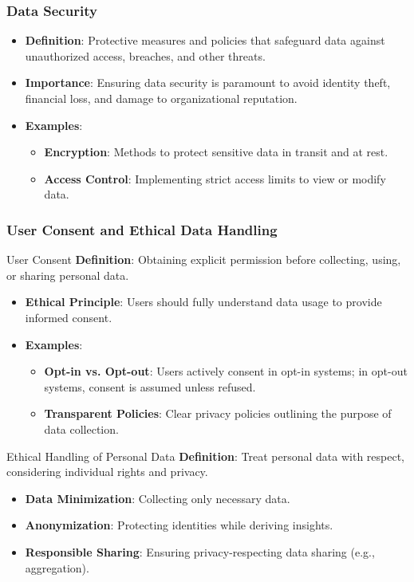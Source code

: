 \documentclass[aspectratio=169]{beamer}
\begin{document}
\begin{frame}[fragile]
    \frametitle{Data Security}
    \begin{itemize}
        \item \textbf{Definition}: Protective measures and policies that safeguard data against unauthorized access, breaches, and other threats.
        \item \textbf{Importance}: Ensuring data security is paramount to avoid identity theft, financial loss, and damage to organizational reputation.
        \item \textbf{Examples}:
        \begin{itemize}
            \item \textbf{Encryption}: Methods to protect sensitive data in transit and at rest.
            \item \textbf{Access Control}: Implementing strict access limits to view or modify data.
        \end{itemize}
    \end{itemize}
\end{frame}

\begin{frame}[fragile]
    \frametitle{User Consent and Ethical Data Handling}
    \begin{block}{User Consent}
        \textbf{Definition}: Obtaining explicit permission before collecting, using, or sharing personal data.
    \end{block}
    \begin{itemize}
        \item \textbf{Ethical Principle}: Users should fully understand data usage to provide informed consent.
        \item \textbf{Examples}:
        \begin{itemize}
            \item \textbf{Opt-in vs. Opt-out}: Users actively consent in opt-in systems; in opt-out systems, consent is assumed unless refused.
            \item \textbf{Transparent Policies}: Clear privacy policies outlining the purpose of data collection.
        \end{itemize}
    \end{itemize}

    \begin{block}{Ethical Handling of Personal Data}
        \textbf{Definition}: Treat personal data with respect, considering individual rights and privacy.
        \begin{itemize}
            \item \textbf{Data Minimization}: Collecting only necessary data.
            \item \textbf{Anonymization}: Protecting identities while deriving insights.
            \item \textbf{Responsible Sharing}: Ensuring privacy-respecting data sharing (e.g., aggregation).
        \end{itemize}
    \end{block}
\end{frame}
\end{document}
